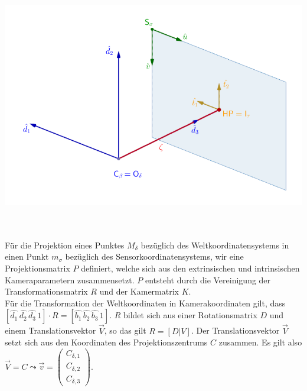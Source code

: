 \begin{minipage}{\linewidth}
	\centering
	\includegraphics[width=0.8\linewidth]{images/UebersichtKoordinatensysteme_beschriftet.png}
	\label{fig:KoordinatensystemeUeberblick}
\end{minipage}\\ \\ 

Für die Projektion eines Punktes $M_\delta$ bezüglich des Weltkoordinatensystems in einen Punkt $m_\sigma$ bezüglich des Sensorkoordinatensystems, wir eine Projektionsmatrix $P$ definiert, welche sich aus den extrinsischen und intrinsischen Kameraparametern zusammensetzt. $P$ entsteht durch die Vereinigung der Transformationsmatrix $R$ und der Kamermatrix $K$\cite{HZ}.\\

Für die Transformation der Weltkoordinaten in Kamerakoordinaten gilt, dass $[\hat{d_1}\,\hat{d_2}\,\hat{d_3}\,1] \cdot R = [\hat{b_1}\,\hat{b_2}\, \hat{b_3}\, 1]$. $R$ bildet sich aus einer Rotationsmatrix $D$ und einem Translationsvektor $\vec{V}$, so das gilt $R = [D|V]$. Der Translationsvektor $\vec{V}$ setzt sich aus den Koordinaten des Projektionszentrums $C$ zusammen. Es gilt also $\vec{V} = C \leadsto \vec{v} = \begin{pmatrix}	C_{\delta,1}\\C_{\delta,2}\\C_{\delta,3}\end{pmatrix}$. 



